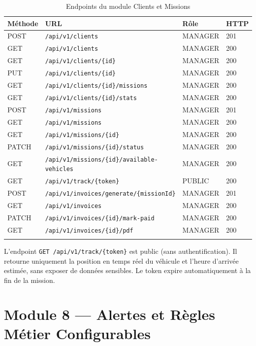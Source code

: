 \documentclass[12pt,a4paper]{report}
\begin{document}
\begin{longtable}{p{1.5cm}p{7cm}p{2.5cm}p{1.5cm}}
\toprule
\textbf{Méthode} & \textbf{URL} & \textbf{Rôle} & \textbf{HTTP} \\
\midrule
\endhead
POST & \texttt{/api/v1/clients} & MANAGER & 201 \\
GET & \texttt{/api/v1/clients} & MANAGER & 200 \\
GET & \texttt{/api/v1/clients/\{id\}} & MANAGER & 200 \\
PUT & \texttt{/api/v1/clients/\{id\}} & MANAGER & 200 \\
GET & \texttt{/api/v1/clients/\{id\}/missions} & MANAGER & 200 \\
GET & \texttt{/api/v1/clients/\{id\}/stats} & MANAGER & 200 \\
POST & \texttt{/api/v1/missions} & MANAGER & 201 \\
GET & \texttt{/api/v1/missions} & MANAGER & 200 \\
GET & \texttt{/api/v1/missions/\{id\}} & MANAGER & 200 \\
PATCH & \texttt{/api/v1/missions/\{id\}/status} & MANAGER & 200 \\
GET & \texttt{/api/v1/missions/\{id\}/available-vehicles} & MANAGER & 200 \\
GET & \texttt{/api/v1/track/\{token\}} & PUBLIC & 200 \\
POST & \texttt{/api/v1/invoices/generate/\{missionId\}} & MANAGER & 201 \\
GET & \texttt{/api/v1/invoices} & MANAGER & 200 \\
PATCH & \texttt{/api/v1/invoices/\{id\}/mark-paid} & MANAGER & 200 \\
GET & \texttt{/api/v1/invoices/\{id\}/pdf} & MANAGER & 200 \\
\bottomrule
\caption{Endpoints du module Clients et Missions}
\end{longtable}

\begin{notebox}
L'endpoint \texttt{GET /api/v1/track/\{token\}} est public (sans authentification). Il retourne uniquement la position en temps réel du véhicule et l'heure d'arrivée estimée, sans exposer de données sensibles. Le token expire automatiquement à la fin de la mission.
\end{notebox}

\chapter{Module 8 — Alertes et Règles Métier Configurables}
\end{document}
